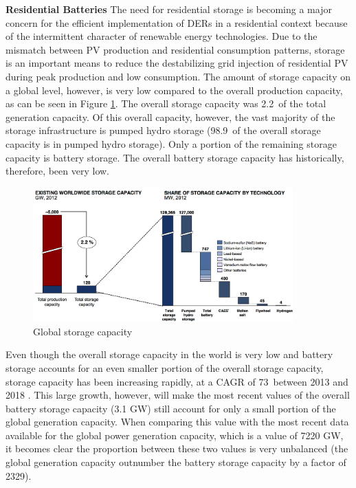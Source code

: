 \textbf{Residential Batteries}
\newline \newline \noindent
The need for residential storage is becoming a major concern for the efficient implementation of DERs in a residential context because of the intermittent character of renewable energy technologies. Due to the mismatch between PV production and residential consumption patterns, storage is an important means to reduce the destabilizing grid injection of residential PV during peak production and low consumption. The amount of storage capacity on a global level, however, is very low compared to the overall production capacity, as can be seen in Figure \ref{Figure:storage}. The overall storage capacity was 2.2\  of the total generation capacity. Of this overall capacity, however, the vast majority of the storage infrastructure is pumped hydro storage (98.9\  of the overall storage capacity is in pumped hydro storage). Only a portion of the remaining storage capacity is battery storage. The overall battery storage capacity has historically, therefore, been very low. 
\newline
\begin{figure}[h!]
\centering
\includegraphics[width=10cm]{Storage.png}
\caption[Global storage capacity]{Global storage capacity \cite{Storage}}
\label{Figure:storage}
\end{figure}
\noindent
\newline
Even though the overall storage capacity in the world is very low and battery storage accounts for an even smaller portion of the overall storage capacity, storage capacity has been increasing rapidly, at a CAGR of 73\  between 2013 and 2018 \cite{Storage}. This large growth, however, will make the most recent values of the overall battery storage capacity (3.1 GW) still account for only a small portion of the global generation capacity. When comparing this value with the most recent data available for the global power generation capacity, which is a value of 7220 GW, it becomes clear the proportion between these two values is very unbalanced (the global generation capacity outnumber the battery storage capacity by a factor of 2329). 
